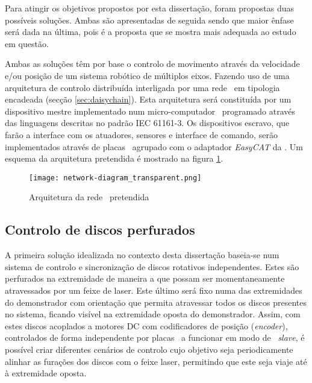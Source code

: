 Para atingir os objetivos propostos por esta dissertação, foram propostas 
duas possíveis soluções. Ambas são apresentadas de seguida sendo que
maior ênfase será dada na última, pois é a proposta que se mostra mais
adequada ao estudo em questão.

Ambas as soluções têm por base o controlo de movimento através da velocidade
e/ou posição de um sistema robótico de múltiplos eixos. Fazendo uso de
uma arquitetura de controlo distribuída interligada por uma rede \ecat\
em tipologia encadeada (secção \ref{sec:daisychain}). Esta arquitetura
será constituída por um dispositivo mestre implementado num micro-computador
\raspi\, programado através das linguagens descritas no padrão
IEC 61161-3. Os dispositivos escravo, que farão a interface com os atuadores,
sensores e interface de comando, serão implementados através de placas
\arduino\ agrupado com o adaptador \emph{EasyCAT} da \cite{ABT:EasyCAT}.
Um esquema da arquitetura pretendida é mostrado na figura
\ref{fig:network-architecture}.

\begin{figure}
 \centering
 \texttt{[image: network-diagram\_transparent.png]}
 \caption{Arquitetura da rede \ecat\ pretendida}
 \label{fig:network-architecture}
\end{figure}



\subsection{Controlo de discos perfurados}\label{sec:discs_project}

A primeira solução idealizada no contexto desta dissertação baseia-se num
sistema de controlo e sincronização de discos rotativos independentes.
Estes são perfurados na extremidade de maneira a que possam ser momentaneamente atravessados por um feixe de laser. Este último será fixo numa das extremidades
do demonstrador com orientação que permita atravessar todos os discos presentes
no sistema, ficando visível na extremidade oposta do demonstrador. Assim,
com estes discos acoplados a motores DC com codificadores de posição (\emph{encoder}),
controlados de forma independente por placas \arduino\ a funcionar em modo
de \ecat\ \emph{slave}, é possível criar diferentes cenários de controlo
cujo objetivo seja periodicamente alinhar as furações dos discos com o
feixe laser, permitindo que este seja viaje até à extremidade oposta.

